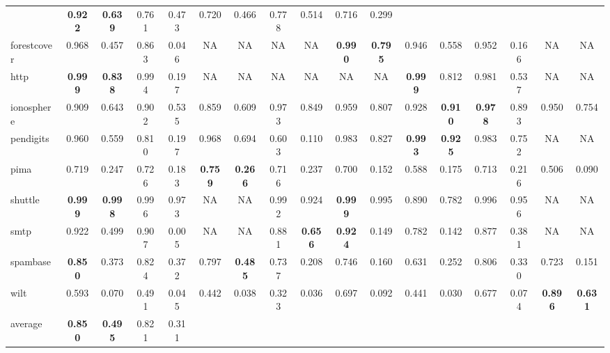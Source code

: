{\begin{landscape}
\begin{table}[htb]
{\begin{tabular}{lcccccccccccccccc}
            & \textbf{0.922} & \textbf{0.639} & 0.761 & 0.473 & 0.720 & 0.466 &
            0.778 & 0.514     & 0.716 & 0.299 \\
            forestcover  &        0.968 & 0.457 & 0.863 & 0.046 & \acs{NA} &
            \acs{NA} & \acs{NA} & \acs{NA} & \textbf{0.990} & \textbf{0.795} &
            0.946 & 0.558 &  0.952    & 0.166 & \acs{NA} & \acs{NA} \\
            http         &        \textbf{0.999} & \textbf{0.838} & 0.994 &
            0.197 & \acs{NA} & \acs{NA} & \acs{NA} & \acs{NA} & \acs{NA} &
            \acs{NA} & \textbf{0.999} & 0.812 &  0.981    & 0.537     &
            \acs{NA} & \acs{NA} \\
            ionosphere   &        0.909 & 0.643 & 0.902 & 0.535 & 0.859 & 0.609
            & 0.973 & 0.849 & 0.959 & 0.807 & 0.928 & \textbf{0.910} &
            \textbf{0.978} & 0.893     & 0.950 & 0.754 \\
            pendigits    &        0.960 & 0.559 & 0.810 & 0.197 & 0.968 & 0.694
            & 0.603 & 0.110 & 0.983 & 0.827 & \textbf{0.993} & \textbf{0.925} &
            0.983 & 0.752     & \acs{NA} & \acs{NA} \\
            pima         &        0.719 & 0.247 & 0.726 & 0.183 &
            \textbf{0.759} & \textbf{0.266} & 0.716 & 0.237 & 0.700 & 0.152 &
            0.588 & 0.175 &  0.713 & 0.216     & 0.506 & 0.090 \\
            shuttle      &        \textbf{0.999} & \textbf{0.998} & 0.996 &
            0.973 & \acs{NA} & \acs{NA} & 0.992 & 0.924 & \textbf{0.999} &
            0.995 & 0.890 & 0.782 & 0.996    & 0.956     & \acs{NA} & \acs{NA}
            \\ smtp         &        0.922 & 0.499 & 0.907 & 0.005 & \acs{NA} &
            \acs{NA} & 0.881 & \textbf{0.656} & \textbf{0.924} & 0.149 & 0.782
            & 0.142 &  0.877    & 0.381     & \acs{NA} & \acs{NA} \\ 
            spambase &        \textbf{0.850} & 0.373 & 0.824 & 0.372 & 0.797 &
            \textbf{0.485} & 0.737 & 0.208 & 0.746 & 0.160 & 0.631 & 0.252 &
            0.806 & 0.330     & 0.723 & 0.151 \\
            wilt         &        0.593 & 0.070 & 0.491 & 0.045 & 0.442 & 0.038
            & 0.323 & 0.036 & 0.697 & 0.092 & 0.441 & 0.030 &  0.677    & 0.074
            & \textbf{0.896} & \textbf{0.631} \\
        \cmidrule{1-17}
            average    & \textbf{0.850} & \textbf{0.495} & 0.821 & 0.311 &

\end{tabular}}
\end{table}
\end{landscape}}
